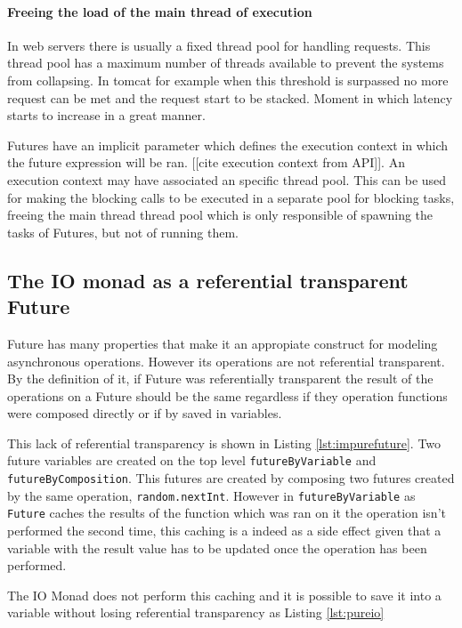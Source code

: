 \documentclass[../main.tex]{subfiles}
\begin{document}
\paragraph{Freeing the load of the main thread of execution}

In web servers there is usually a fixed thread pool for handling requests. This
thread pool has a maximum number of threads available to prevent the systems
from collapsing. In tomcat for example when this threshold is surpassed no more
request can be met and the request start to be stacked. Moment in which latency
starts to increase in a great manner.

Futures have an implicit parameter which defines the execution context in which
the future expression will be ran. [[cite execution context from API]]. An
execution context may have associated an specific thread pool. This can be used
for making the blocking calls to be executed in a separate pool for blocking
tasks, freeing the main thread thread pool which is only responsible of spawning the tasks
of Futures, but not of running them.

\subsection{The IO monad as a referential transparent Future}
Future has many properties that make it an appropiate construct for modeling
asynchronous operations. However its operations are not referential transparent.
By the definition of
it, if Future was referentially transparent the result of the operations on a
Future should be the same regardless if they operation functions were composed
directly or if by saved in variables.



This lack of referential transparency is shown in Listing \ref{lst:impurefuture}. Two
future variables are created on the top level \texttt{futureByVariable} and
\texttt{futureByComposition}. This futures are created by composing two futures
created by the same operation, \texttt{random.nextInt}. However in
\texttt{futureByVariable} as \texttt{Future} caches the results of the function
which was ran on it the operation isn't performed the second time, this caching
is a indeed as a side effect given that a variable with the result value has to
be updated once the operation has been performed.

The IO Monad does not perform this caching and it is possible to save it into a
variable without losing referential transparency as Listing \ref{lst:pureio}


\end{document}
